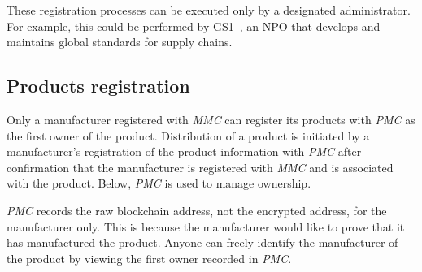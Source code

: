\documentclass[conference]{IEEEtran}
\begin{document}
These %
registration processes %
can be executed only by a designated administrator.
For example, this could be performed by GS1~\cite{GS1}, an NPO that develops and maintains global standards for supply chains.


\subsection{Products registration}
Only a manufacturer registered with \textit{MMC} can register its products with \textit{PMC} as the first owner of the product.
Distribution of a product is initiated by a manufacturer's registration of the product information with \textit{PMC} after confirmation that the manufacturer is registered with \textit{MMC} and is associated with the product.
Below, \textit{PMC} is used to manage ownership.

\textit{PMC} records the raw blockchain address, not the encrypted address, for the manufacturer only.
This is because the manufacturer would like to prove that it has manufactured the product.
Anyone can freely identify the manufacturer of the product by viewing the first owner recorded in \textit{PMC}.
\end{document}
